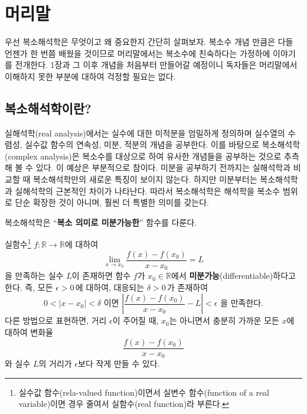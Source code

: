 \chapter*[머리말]{머리말}




우선 복소해석학은 무엇이고 왜 중요한지 간단히 살펴보자.
복소수 개념 만큼은 다들 언젠가 한 번쯤 배웠을 것이므로 
머리말에서는 복소수에 친숙하다는 가정하에 이야기를 전개한다.
1장과 그 이후 개념을 처음부터 만들어갈 예정이니
독자들은 머리말에서 이해하지 못한 부분에 대하여 걱정할 필요는 없다.

\section*{복소해석학이란?}
실해석학(real analysis)에서는 실수에 대한 미적분을 엄밀하게 정의하며
실수열의 수렴성, 실수값 함수의 연속성, 미분, 적분의 개념을 공부한다.
이를 바탕으로 복소해석학(complex analysis)은
복소수를 대상으로 하여 유사한 개념들을 공부하는 것으로 추측해 볼 수 있다.
이 예상은 부분적으로 참이다.
미분을 공부하기 전까지는 실해석학과 비교할 때 복소해석학만의
새로운 특징이 보이지 않는다.
하지만 미분부터는 복소해석학과 실해석학의 근본적인 차이가 나타난다.
따라서 복소해석학은 해석학을 복소수 범위로 단순 확장한 것이 아니며, 훨씬 더 특별한 의미를 갖는다.

\begin{tcolorbox}[breakable, colback = white, colframe = myblue, before=\par\smallskip, after=\par\smallskip]
\begin{center} 
복소해석학은 ``{\bf 복소 의미로 미분가능한}'' 함수를 다룬다.
\end{center}
\end{tcolorbox}

실함수\footnote{
실수값 함수(rela-valued function)이면서 실변수 함수(function of a real variable)이면 경우 줄여서
실함수(real function)라 부른다.
}
 $f:\mathbb R \to \mathbb R$에 대하여
$$
\lim_{x\to x_0} \frac{f(x)-f(x_0)}{x-x_0} = L
$$
을 만족하는 실수 $L$이 존재하면 
함수 $f$가 $x_0\in \mathbb R$에서 {\bf 미분가능}(differentiable)하다고 한다.
즉, 모든 $\epsilon>0\,$에 대하여,  대응되는 $\delta>0\,$가 존재하여
$$
0<|x-x_0|<\delta \text{ 이면 }
\left| \frac{f(x)-f(x_0)}{x-x_0} - L\right| < \epsilon \text{ 을 만족한다.}
$$
다른 방법으로 표현하면, 
거리 $\epsilon$이 주어질 때,
$x_0$는 아니면서 충분히 가까운 모든 $x$에 대하여 변화율
$$
 \frac{f(x)-f(x_0)}{x-x_0}
$$
와 실수 $L$의 거리가 $\epsilon$보다 작게 만들 수 있다.

